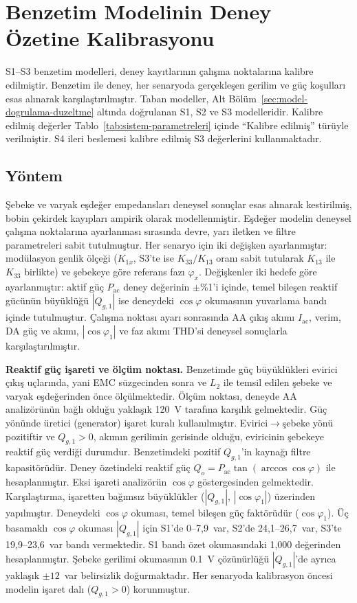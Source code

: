 \section{Benzetim Modelinin Deney Özetine Kalibrasyonu}
\label{sec:kalibrasyon}

S1--S3 benzetim modelleri, deney kayıtlarının çalışma noktalarına kalibre edilmiştir. Benzetim ile deney, her senaryoda gerçekleşen gerilim ve güç koşulları esas alınarak karşılaştırılmıştır. Taban modeller, Alt Bölüm~\ref{sec:model-dogrulama-duzeltme} altında doğrulanan S1, S2 ve S3 modelleridir. Kalibre edilmiş değerler Tablo~\ref{tab:sistem-parametreleri} içinde ``Kalibre edilmiş'' türüyle verilmiştir. S4 ileri beslemesi kalibre edilmiş S3 değerlerini kullanmaktadır.

\subsection{Yöntem}

Şebeke ve varyak eşdeğer empedansları deneysel sonuçlar esas alınarak kestirilmiş, bobin çekirdek kayıpları ampirik olarak modellenmiştir. Eşdeğer modelin deneysel çalışma noktalarına ayarlanması sırasında devre, yarı iletken ve filtre parametreleri sabit tutulmuştur. Her senaryo için iki değişken ayarlanmıştır: modülasyon genlik ölçeği ($K_{1x}$, S3'te ise $K_{33}/K_{13}$ oranı sabit tutularak $K_{13}$ ile $K_{33}$ birlikte) ve şebekeye göre referans fazı $\varphi_x$. Değişkenler iki hedefe göre ayarlanmıştır: aktif güç $P_{\mathrm{ac}}$ deney değerinin $\pm$\%1'i içinde, temel bileşen reaktif gücünün büyüklüğü $|Q_{g,1}|$ ise deneydeki $\cos\varphi$ okumasının yuvarlama bandı içinde tutulmuştur. Çalışma noktası ayarı sonrasında AA çıkış akımı $I_{\mathrm{ac}}$, verim, DA güç ve akımı, $|\cos\varphi_1|$ ve faz akımı THD'si deneysel sonuçlarla karşılaştırılmıştır.

\textbf{Reaktif güç işareti ve ölçüm noktası.} Benzetimde güç büyüklükleri evirici çıkış uçlarında, yani EMC süzgecinden sonra ve $L_2$ ile temsil edilen şebeke ve varyak eşdeğerinden önce ölçülmektedir. Ölçüm noktası, deneyde AA analizörünün bağlı olduğu yaklaşık \SI{120}{\volt} tarafına karşılık gelmektedir. Güç yönünde üretici (generator) işaret kuralı kullanılmıştır. Evirici$\rightarrow$şebeke yönü pozitiftir ve $Q_{g,1}>0$, akımın gerilimin gerisinde olduğu, eviricinin şebekeye reaktif güç verdiği durumdur. Benzetimdeki pozitif $Q_{g,1}$'in kaynağı filtre kapasitörüdür. Deney özetindeki reaktif güç $Q_o=P_{\mathrm{ac}}\tan(\arccos\cos\varphi)$ ile hesaplanmıştır. Eksi işareti analizörün $\cos\varphi$ göstergesinden gelmektedir. Karşılaştırma, işaretten bağımsız büyüklükler ($|Q_{g,1}|$, $|\cos\varphi_1|$) üzerinden yapılmıştır. Deneydeki $\cos\varphi$ okuması, temel bileşen güç faktörüdür ($\cos\varphi_1$). Üç basamaklı $\cos\varphi$ okuması $|Q_{g,1}|$ için S1'de 0--7,9~var, S2'de 24,1--26,7~var, S3'te 19,9--23,6~var bandı vermektedir. S1 bandı özet okumasındaki 1,000 değerinden hesaplanmıştır. Şebeke gerilimi okumasının \SI{0.1}{\volt} çözünürlüğü $|Q_{g,1}|$'de ayrıca yaklaşık $\pm12$~var belirsizlik doğurmaktadır. Her senaryoda kalibrasyon öncesi modelin işaret dalı ($Q_{g,1}>0$) korunmuştur.

